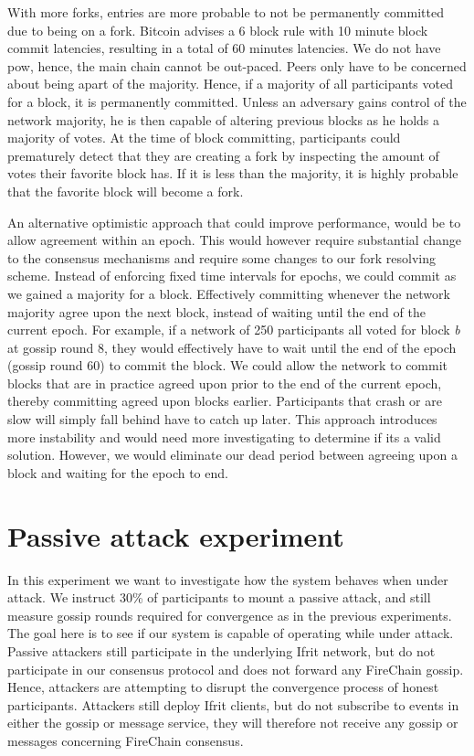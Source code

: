 \documentclass[USenglish]{uit-thesis}
\begin{document}
With more forks, entries are more probable to not be permanently committed due to being on a fork. 
Bitcoin \cite{bitcoin} advises a 6 block rule with 10 minute block commit latencies, resulting in a total of 60 minutes latencies.
We do not have \gls{pow}, hence, the main chain cannot be out-paced.
Peers only have to be concerned about being apart of the majority.
Hence, if a majority of all participants voted for a block, it is permanently committed.
Unless an adversary gains control of the network majority, he is then capable of altering previous blocks as he holds a majority of votes.
At the time of block committing, participants could prematurely detect that they are creating a fork by inspecting the amount of votes their favorite block has.
If it is less than the majority, it is highly probable that the favorite block will become a fork.

 

An alternative optimistic approach that could improve performance, would be to allow agreement within an epoch. 
This would however require substantial change to the consensus mechanisms and require some changes to our fork resolving scheme.
Instead of enforcing fixed time intervals for epochs, we could commit as we gained a majority for a block.
Effectively committing whenever the network majority agree upon the next block, instead of waiting until the end of the current epoch.
For example, if a network of 250 participants all voted for block \textit{b} at gossip round 8, they would effectively have to wait until the end of the epoch (gossip round 60) to commit the block.
We could allow the network to commit blocks that are in practice agreed upon prior to the end of the current epoch, thereby committing agreed upon blocks earlier. 
Participants that crash or are slow will simply fall behind have to catch up later.
This approach introduces more instability and would need more investigating to determine if its a valid solution.
However, we would eliminate our dead period between agreeing upon a block and waiting for the epoch to end.

 

 


\section{Passive attack experiment}
In this experiment we want to investigate how the system behaves when under attack.
We instruct 30\% of participants to mount a passive attack, and still measure gossip rounds required for convergence as in the previous experiments.
The goal here is to see if our system is capable of operating while under attack.
Passive attackers still participate in the underlying Ifrit network, but do not participate in our consensus protocol and does not forward any FireChain gossip.
Hence, attackers are attempting to disrupt the convergence process of honest participants.
Attackers still deploy Ifrit clients, but do not subscribe to events in either the gossip or message service, they will therefore not receive any gossip or messages concerning FireChain consensus.
\end{document}
